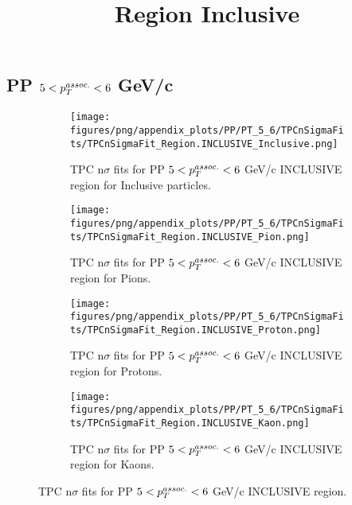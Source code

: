     
            \subsection{PP $5 < \pTassoc < 6$ GeV/c}
            \begin{figure}[H]
                \title{Region Inclusive}
                \begin{subfigure}[b]{0.5\textwidth}
                    \centering
                    \texttt{[image: figures/png/appendix\_plots/PP/PT\_5\_6/TPCnSigmaFits/TPCnSigmaFit\_Region.INCLUSIVE\_Inclusive.png]}
                    \caption{TPC n$\sigma$ fits for PP $5 < \pTassoc < 6$ GeV/c INCLUSIVE region for Inclusive particles.}
                    \label{fig:appendix_PP_$5 < \pTassoc < 6$ GeV/c_INCLUSIVE_Inclusive}
                \end{subfigure}
                \begin{subfigure}[b]{0.5\textwidth}
                    \centering
                    \texttt{[image: figures/png/appendix\_plots/PP/PT\_5\_6/TPCnSigmaFits/TPCnSigmaFit\_Region.INCLUSIVE\_Pion.png]}
                    \caption{TPC n$\sigma$ fits for PP $5 < \pTassoc < 6$ GeV/c INCLUSIVE region for Pions.}
                    \label{fig:appendix_PP_$5 < \pTassoc < 6$ GeV/c_INCLUSIVE_Pion}
                \end{subfigure}
                \begin{subfigure}[b]{0.5\textwidth}
                    \centering
                    \texttt{[image: figures/png/appendix\_plots/PP/PT\_5\_6/TPCnSigmaFits/TPCnSigmaFit\_Region.INCLUSIVE\_Proton.png]}
                    \caption{TPC n$\sigma$ fits for PP $5 < \pTassoc < 6$ GeV/c INCLUSIVE region for Protons.}
                    \label{fig:appendix_PP_$5 < \pTassoc < 6$ GeV/c_INCLUSIVE_Proton}
                \end{subfigure}
                \begin{subfigure}[b]{0.5\textwidth}
                    \centering
                    \texttt{[image: figures/png/appendix\_plots/PP/PT\_5\_6/TPCnSigmaFits/TPCnSigmaFit\_Region.INCLUSIVE\_Kaon.png]}
                    \caption{TPC n$\sigma$ fits for PP $5 < \pTassoc < 6$ GeV/c INCLUSIVE region for Kaons.}
                    \label{fig:appendix_PP_$5 < \pTassoc < 6$ GeV/c_INCLUSIVE_Kaon}
                \end{subfigure}
                \caption{TPC n$\sigma$ fits for PP $5 < \pTassoc < 6$ GeV/c INCLUSIVE region.}
                \label{fig:appendix_PP_$5 < \pTassoc < 6$ GeV/c_INCLUSIVE}
            \end{figure}

